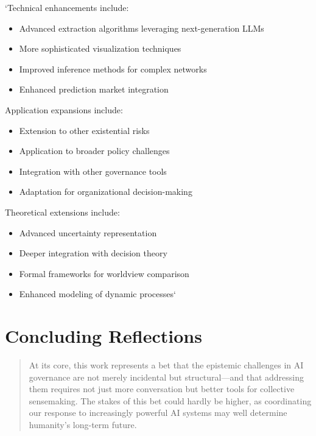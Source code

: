 \documentclass[]{book}
\providecommand{\tightlist}{%
  \setlength{\itemsep}{0pt}\setlength{\parskip}{0pt}}
\begin{document}
`Technical enhancements include:

\begin{itemize}
\tightlist
\item
  Advanced extraction algorithms leveraging next-generation LLMs
\item
  More sophisticated visualization techniques
\item
  Improved inference methods for complex networks
\item
  Enhanced prediction market integration
\end{itemize}

Application expansions include:

\begin{itemize}
\tightlist
\item
  Extension to other existential risks
\item
  Application to broader policy challenges
\item
  Integration with other governance tools
\item
  Adaptation for organizational decision-making
\end{itemize}

Theoretical extensions include:

\begin{itemize}
\tightlist
\item
  Advanced uncertainty representation
\item
  Deeper integration with decision theory
\item
  Formal frameworks for worldview comparison
\item
  Enhanced modeling of dynamic processes`
\end{itemize}

\section{Concluding Reflections}\label{sec-concluding-reflections}

\begin{quote}
At its core, this work represents a bet that the epistemic challenges in
AI governance are not merely incidental but structural---and that
addressing them requires not just more conversation but better tools for
collective sensemaking. The stakes of this bet could hardly be higher,
as coordinating our response to increasingly powerful AI systems may
well determine humanity's long-term future.
\end{quote}
\end{document}
